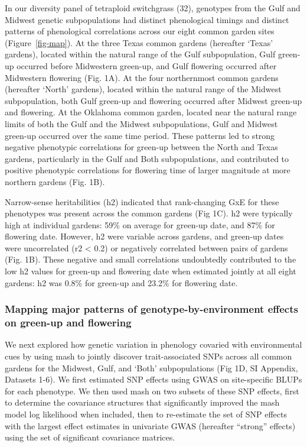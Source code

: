 \documentclass[
  9pt,
  twocolumn,
  twoside]{pnas-new}
\begin{document}
In our diversity panel of tetraploid switchgrass (32), genotypes from
the Gulf and Midwest genetic subpopulations had distinct phenological
timings and distinct patterns of phenological correlations across our
eight common garden sites (Figure~\ref{fig-map}). At the three Texas
common gardens (hereafter `Texas' gardens), located within the natural
range of the Gulf subpopulation, Gulf green-up occurred before
Midwestern green-up, and Gulf flowering occurred after Midwestern
flowering (Fig. 1A). At the four northernmost common gardens (hereafter
`North' gardens), located within the natural range of the Midwest
subpopulation, both Gulf green-up and flowering occurred after Midwest
green-up and flowering. At the Oklahoma common garden, located near the
natural range limits of both the Gulf and the Midwest subpopulations,
Gulf and Midwest green-up occurred over the same time period. These
patterns led to strong negative phenotypic correlations for green-up
between the North and Texas gardens, particularly in the Gulf and Both
subpopulations, and contributed to positive phenotypic correlations for
flowering time of larger magnitude at more northern gardens (Fig. 1B).

Narrow-sense heritabilities (h2) indicated that rank-changing GxE for
these phenotypes was present across the common gardens (Fig 1C). h2 were
typically high at individual gardens: 59\% on average for green-up date,
and 87\% for flowering date. However, h2 were variable across gardens,
and green-up dates were uncorrelated (r2 \textless{} 0.2) or negatively
correlated between pairs of gardens (Fig. 1B). These negative and small
correlations undoubtedly contributed to the low h2 values for green-up
and flowering date when estimated jointly at all eight gardens: h2 was
0.8\% for green-up and 23.2\% for flowering date.

\subsubsection{Mapping major patterns of genotype-by-environment effects
on green-up and
flowering}\label{mapping-major-patterns-of-genotype-by-environment-effects-on-green-up-and-flowering}

We next explored how genetic variation in phenology covaried with
environmental cues by using mash to jointly discover trait-associated
SNPs across all common gardens for the Midwest, Gulf, and `Both'
subpopulations (Fig 1D, SI Appendix, Datasets 1-6). We first estimated
SNP effects using GWAS on site-specific BLUPs for each phenotype. We
then used mash on two subsets of these SNP effects, first to determine
the covariance structures that significantly improved the mash model log
likelihood when included, then to re-estimate the set of SNP effects
with the largest effect estimates in univariate GWAS (hereafter
``strong'' effects) using the set of significant covariance matrices.
\end{document}
